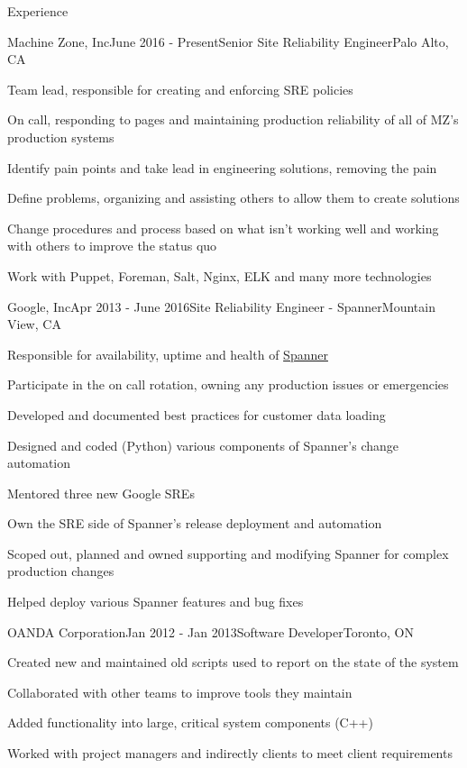 \documentclass{resume}
\begin{document}
  \begin{rSection}{Experience}
    \begin{rSubsection}{Machine Zone, Inc}{June 2016 - Present}{Senior Site Reliability Engineer}{Palo Alto, CA}
      \item Team lead, responsible for creating and enforcing SRE policies
      \item On call, responding to pages and maintaining production reliability of all of MZ's production systems
      \item Identify pain points and take lead in engineering solutions, removing the pain
      \item Define problems, organizing and assisting others to allow them to create solutions
      \item Change procedures and process based on what isn't working well and working with others to improve the status quo
      \item Work with Puppet, Foreman, Salt, Nginx, ELK and many more technologies
    \end{rSubsection}

    \begin{rSubsection}{Google, Inc}{Apr 2013 - June 2016}{Site Reliability Engineer - Spanner}{Mountain View, CA}
      \item Responsible for availability, uptime and health of \href{https://en.wikipedia.org/wiki/Spanner_(database)}{Spanner}
      \item Participate in the on call rotation, owning any production issues or emergencies
      \item Developed and documented best practices for customer data loading
      \item Designed and coded (Python) various components of Spanner's change automation
      \item Mentored three new Google SREs 
      \item Own the SRE side of Spanner's release deployment and automation
      \item Scoped out, planned and owned supporting and modifying Spanner for complex production changes
      \item Helped deploy various Spanner features and bug fixes
    \end{rSubsection}

    \begin{rSubsection}{OANDA Corporation}{Jan 2012 - Jan 2013}{Software Developer}{Toronto, ON}
      \item Created new and maintained old scripts used to report on the state of the system
      \item Collaborated with other teams to improve tools they maintain
      \item Added functionality into large, critical system components (C++)
      \item Worked with project managers and indirectly clients to meet client requirements
    \end{rSubsection}


\end{rSection}
\end{document}
